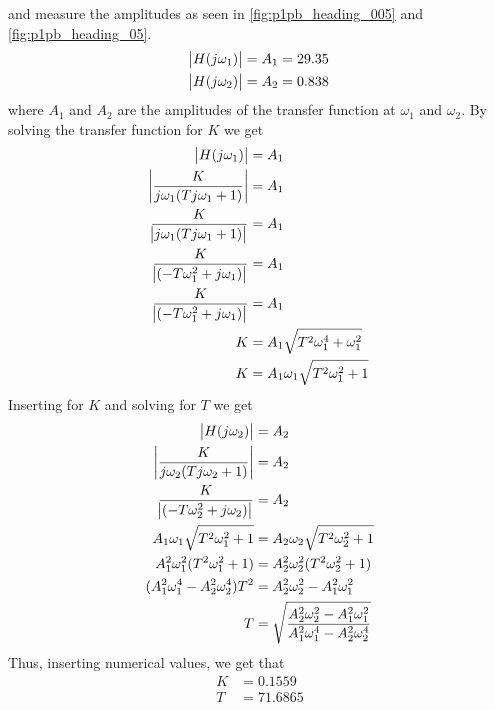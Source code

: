 and measure the amplitudes as seen in \cref{fig:p1pb_heading_005} and \cref{fig:p1pb_heading_05}.  
\begin{align*}
    \abs{H(j\omega_1)} = A_1 = 29.35\\
    \abs{H(j\omega_2)} = A_2 = 0.838
\end{align*}
where $A_1$ and $A_2$ are the amplitudes of the transfer function at $\omega_1$ and $\omega_2$.
By solving the transfer function for $K$ we get
\begin{align*}
    \abs{H(j\omega_1)} &= A_1\\
    \abs{\frac{K}{j\omega_1(Tj\omega_1+1)}} &= A_1\\
    \frac{K}{\abs{j\omega_1(Tj\omega_1+1)}} &= A_1\\
    \frac{K}{\abs{(-T\omega_1^2+j\omega_1)}} &= A_1\\
    \frac{K}{\abs{(-T\omega_1^2+j\omega_1)}} &= A_1\\
    K &= A_1\sqrt{T^2\omega_1^4+\omega_1^2}\\
    K &= A_1\omega_1\sqrt{T^2\omega_1^2+1}\\
\end{align*}
Inserting for $K$ and solving for $T$ we get
\begin{align*}
    \abs{H(j\omega_2)} &= A_2\\
    \abs{\frac{K}{j\omega_2(Tj\omega_2+1)}} &= A_2\\
    \frac{K}{\abs{(-T\omega_2^2+j\omega_2)}} &= A_2\\
    A_1\omega_1\sqrt{T^2\omega_1^2+1} &= A_2 \omega_2\sqrt{T^2\omega_2^2+1}\\
    A_1^2\omega_1^2(T^2\omega_1^2+1) &= A_2^2\omega_2^2(T^2\omega_2^2+1)\\
    (A_1^2\omega_1^4-A_2^2\omega_2^4)T^2 &= A_2^2\omega_2^2-A_1^2\omega_1^2\\
    T &= \sqrt{\frac{A_2^2\omega_2^2-A_1^2\omega_1^2}{A_1^2\omega_1^4-A_2^2\omega_2^4}}\\
\end{align*}
Thus, inserting numerical values, we get that
\begin{align}
    K &= 0.1559 \\ 
    T &= 71.6865
\end{align}

